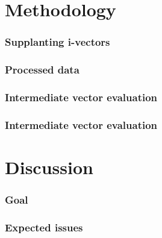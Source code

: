 \documentclass[11pt,english]{beamer}
\begin{document}
\section{Methodology}

\begin{frame}
  \frametitle{Supplanting i-vectors}
  
\end{frame}

\begin{frame}
  \frametitle{Processed data}
  
\end{frame}

\begin{frame}
  \frametitle{Intermediate vector evaluation}
  
\end{frame}

\begin{frame}
  \frametitle{Intermediate vector evaluation}
  
\end{frame}

\section{Discussion}

\begin{frame}
  \frametitle{Goal}
  
\end{frame}

\begin{frame}
  \frametitle{Expected issues}
  
\end{frame}
\end{document}
